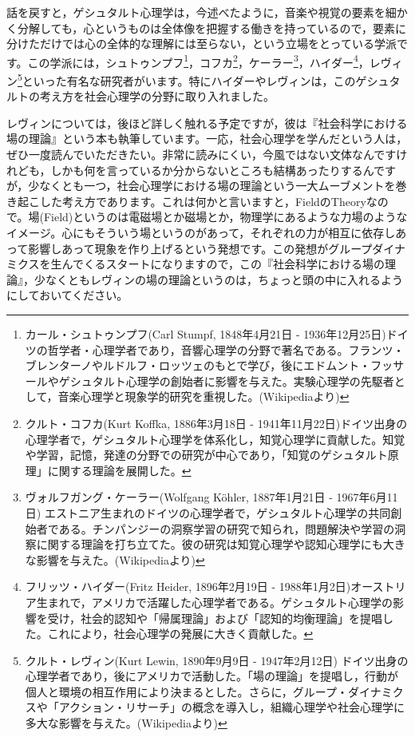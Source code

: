 \documentclass{ltjsbook}
\begin{document}
話を戻すと，ゲシュタルト心理学は，今述べたように，音楽や視覚の要素を細かく分解しても，心というものは全体像を把握する働きを持っているので，要素に分けただけでは心の全体的な理解には至らない，という立場をとっている学派です。この学派には，シュトゥンプフ\footnote{カール・シュトゥンプフ(Carl Stumpf, 1848年4月21日 - 1936年12月25日)ドイツの哲学者・心理学者であり，音響心理学の分野で著名である。フランツ・ブレンターノやルドルフ・ロッツェのもとで学び，後にエドムント・フッサールやゲシュタルト心理学の創始者に影響を与えた。実験心理学の先駆者として，音楽心理学と現象学的研究を重視した。(Wikipediaより)}，コフカ\footnote{クルト・コフカ(Kurt Koffka, 1886年3月18日 - 1941年11月22日)ドイツ出身の心理学者で，ゲシュタルト心理学を体系化し，知覚心理学に貢献した。知覚や学習，記憶，発達の分野での研究が中心であり，「知覚のゲシュタルト原理」に関する理論を展開した。}，ケーラー\footnote{ヴォルフガング・ケーラー(Wolfgang K\"ohler, 1887年1月21日 - 1967年6月11日)  エストニア生まれのドイツの心理学者で，ゲシュタルト心理学の共同創始者である。チンパンジーの洞察学習の研究で知られ，問題解決や学習の洞察に関する理論を打ち立てた。彼の研究は知覚心理学や認知心理学にも大きな影響を与えた。(Wikipediaより)}，ハイダー\footnote{フリッツ・ハイダー(Fritz Heider, 1896年2月19日 - 1988年1月2日)オーストリア生まれで，アメリカで活躍した心理学者である。ゲシュタルト心理学の影響を受け，社会的認知や「帰属理論」および「認知的均衡理論」を提唱した。これにより，社会心理学の発展に大きく貢献した。}，レヴィン\footnote{クルト・レヴィン(Kurt Lewin, 1890年9月9日 - 1947年2月12日) ドイツ出身の心理学者であり，後にアメリカで活動した。「場の理論」を提唱し，行動が個人と環境の相互作用により決まるとした。さらに，グループ・ダイナミクスや「アクション・リサーチ」の概念を導入し，組織心理学や社会心理学に多大な影響を与えた。(Wikipediaより)}といった有名な研究者がいます。特にハイダーやレヴィンは，このゲシュタルトの考え方を社会心理学の分野に取り入れました。

レヴィンについては，後ほど詳しく触れる予定ですが，彼は『社会科学における場の理論』\parencite{Lewin}という本も執筆しています。一応，社会心理学を学んだという人は，ぜひ一度読んでいただきたい。非常に読みにくい，今風ではない文体なんですけれども，しかも何を言っているか分からないところも結構あったりするんですが，少なくとも一つ，社会心理学における場の理論という一大ムーブメントを巻き起こした考え方であります。これは何かと言いますと，FieldのTheoryなので。場(Field)というのは電磁場とか磁場とか，物理学にあるような力場のようなイメージ。心にもそういう場というのがあって，それぞれの力が相互に依存しあって影響しあって現象を作り上げるという発想です。この発想がグループダイナミクスを生んでくるスタートになりますので，この『社会科学における場の理論』，少なくともレヴィンの場の理論というのは，ちょっと頭の中に入れるようにしておいてください。
\end{document}
